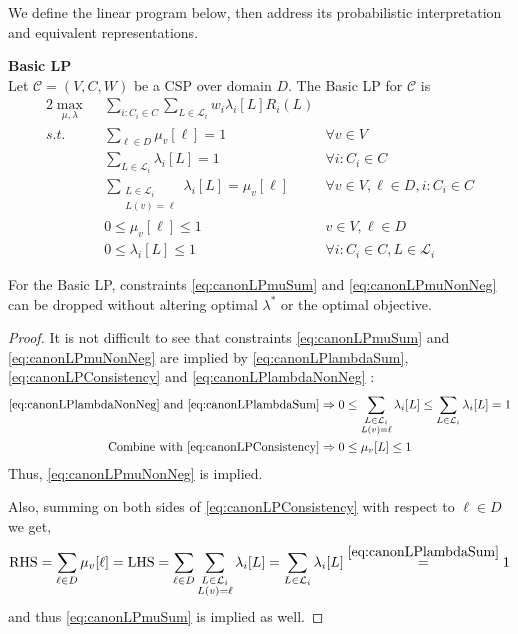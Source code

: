 We define the linear program below, then address its probabilistic interpretation and equivalent representations.
\begin{definition}\textbf{Basic LP} \\
Let $\mathcal{C} = (V,C,W)$ be a CSP over domain $D$. The Basic LP for $\mathcal{C}$ is
\begin{alignat}{2}
\max_{\mu, \lambda} ~&~ \sum_{i : C_i \in C} \sum_{L \in \mathcal{L}_i}   w_i\lambda_i[L] R_i(L) & \\
s.t. ~ & ~ \sum_{\ell \in D} \mu_v[\ell] = 1 & \forall v \in V  \label{eq:canonLPmuSum} \\
     ~ & ~ \sum_{L \in \mathcal{L}_i} \lambda_i[L] = 1  & \forall i : C_i \in C \label{eq:canonLPlambdaSum} \\
     ~ & ~ \sum_{\substack{ L \in \mathcal{L}_i \\ L(v) = \ell }} \lambda_i[L] = \mu_v[\ell]  & \forall v \in V, \ell \in D, i : C_i \in C \label{eq:canonLPConsistency} \\
     ~ & ~ 0 \leq \mu_v[\ell] \leq 1 & v \in V, \ell \in D \label{eq:canonLPmuNonNeg}\\
     ~ & ~ 0 \leq \lambda_i[L] \leq 1  & \forall  i : C_i \in C, L \in \mathcal{L}_i  \label{eq:canonLPlambdaNonNeg} 
\end{alignat}
\end{definition}

\begin{lemma}\label{le:super}
For the Basic LP, constraints \ref{eq:canonLPmuSum} and \ref{eq:canonLPmuNonNeg} can be dropped without altering optimal $\lambda^*$ or the optimal objective.
\end{lemma}
\begin{proof}
It is not difficult to see that constraints \ref{eq:canonLPmuSum} and \ref{eq:canonLPmuNonNeg} are implied by \ref{eq:canonLPlambdaSum}, \ref{eq:canonLPConsistency} and \ref{eq:canonLPlambdaNonNeg} :
\begin{align*}
\ref{eq:canonLPlambdaNonNeg} \rm{\ and \ } \ref{eq:canonLPlambdaSum} &\Rightarrow 0\leq  \sum_{\substack{ L \in \mathcal{L}_i \\ L(v) = \ell }} \lambda_i[L] \leq  \sum_{L \in \mathcal{L}_i} \lambda_i[L] = 1  \\
{\rm \ Combine\ with \ }\ref{eq:canonLPConsistency}&\Rightarrow  0\leq \mu_v[L] \leq 1
\end{align*}
Thus, \ref{eq:canonLPmuNonNeg} is implied. 

Also, summing on both sides of \ref{eq:canonLPConsistency} with respect to $\ell \in D$ we get, 
\begin{align*}
{\rm RHS} = \sum_{\ell \in D} \mu_v[\ell] = {\rm LHS} = \sum_{\ell \in D} \sum_{\substack{ L \in \mathcal{L}_i \\ L(v) = \ell }} \lambda_i[L] = \sum_{L \in \mathcal{L}_i} \lambda_i[L] \overset{\ref{eq:canonLPlambdaSum}}=1
\end{align*}
and thus \ref{eq:canonLPmuSum} is implied as well.
\end{proof}

